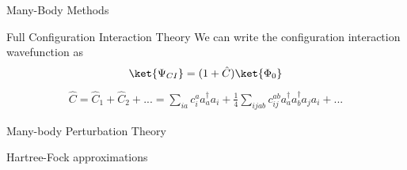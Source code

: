 \documentclass[twoside,english]{uiofysmaster}
\begin{document}
\begin{chapter}{Many-Body Methods}
\begin{section}{Full Configuration Interaction Theory}
		We can write the configuration interaction wavefunction as 
		\begin{align}
			\ket{\Psi_{CI}} = (1 + \hat C) \ket{\Phi_0} 
		\end{align}
		\begin{align}
			\hat C = \hat C_1 + \hat C_2 + ... =  \sum_{ia} c_i^a a_a^{\dagger} a_i + \frac{1}{4} \sum_{ijab} c_{ij}^{ab} a_a^{\dagger} a_b^{\dagger} a_j a_i + ...
		\end{align}
	\end{section}	

 \begin{section}{Many-body Perturbation Theory}
 	
 \end{section}

 \begin{section}{Hartree-Fock approximations}
 	
 \end{section}

\end{chapter}
\end{document}
